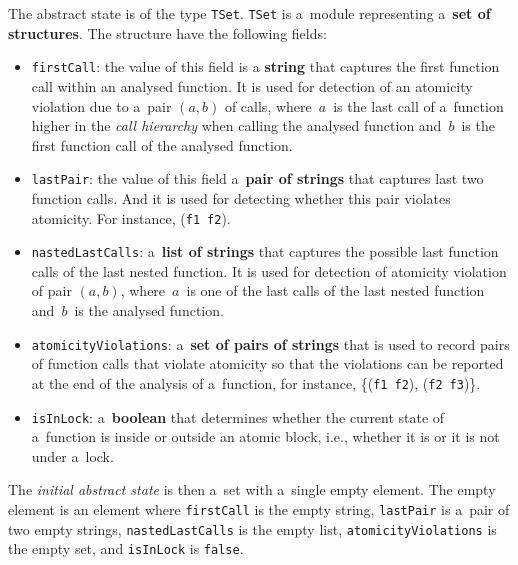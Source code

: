 The abstract state is of the type \texttt{TSet}. \texttt{TSet} is a~module
representing a~\textbf{set of structures}. The structure have the following
fields:
\begin{itemize}
    \item
        \texttt{firstCall}: the value of this field is a \textbf{string} 
        that captures the first function call within an analysed function. 
        It is used for detection of an atomicity violation due to a~pair 
        $ (a, b) $ of calls, where~$ a $~is the last call of a~function 
        higher in the \emph{call hierarchy} when calling the analysed 
        function and~$ b $~is the first function call of the analysed 
        function.

    \item
        \texttt{lastPair}: the value of this field a~\textbf{pair of 
        strings} that captures last two function calls. And it is used 
        for detecting whether this pair violates atomicity. For instance,
        (\texttt{f1}~\texttt{f2}).

    \item
        \texttt{nastedLastCalls}: a~\textbf{list of strings} that captures 
        the possible last function calls of the last nested function. 
        It is used for detection of atomicity violation of pair $ (a, b) $,
        where~$ a $~is one of the last calls of the last nested function 
        and~$ b $~is the analysed function.

    \item
        \texttt{atomicityViolations}: a~\textbf{set of pairs of strings}
        that is used to record pairs of function calls that violate atomicity
        so that the violations can be reported at the end of the
        analysis of a~function, for instance, \{(\texttt{f1}~\texttt{f2}),
        (\texttt{f2}~\texttt{f3})\}.

    \item
        \texttt{isInLock}: a~\textbf{boolean} that determines
        whether the current state of a~function is inside or outside an
        atomic block, i.e., whether it is or it is not under a~lock.
\end{itemize}
The \emph{initial abstract state} is then a~set with a~single empty element.
The empty element is an element where \texttt{firstCall} is the empty
string, \texttt{lastPair} is a~pair of two empty strings,
\texttt{nastedLastCalls} is the empty list, \texttt{atomicityViolations} is
the empty set, and \texttt{isInLock} is \texttt{false}.

